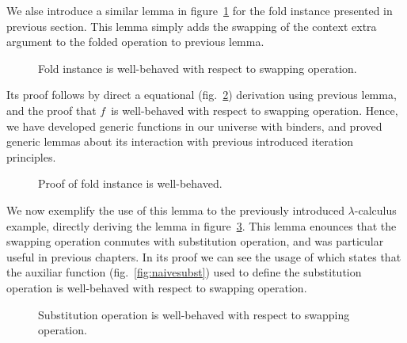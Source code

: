\documentclass{book}
\begin{document}
We alse introduce a similar lemma in figure~\ref{fig:swapfoldCtx} for the fold instance presented in previous section. This lemma simply adds the swapping of the context extra argument to the folded operation to previous lemma. 

\begin{figure}[h]
  \caption{Fold instance is well-behaved with respect to swapping operation.}
\label{fig:swapfoldCtx}
\end{figure}

Its proof follows by direct a equational (fig.~\ref{fig:swapfoldCtxproof}) derivation using previous lemma, and the proof that $f$\ is well-behaved with respect to swapping operation. Hence, we have developed generic functions in our universe with binders, and proved generic lemmas about its interaction with previous introduced iteration principles. 

\begin{figure}[h]
  \caption{Proof of fold instance is well-behaved.}
\label{fig:swapfoldCtxproof}
\end{figure}


We now exemplify the use of this lemma to the previously introduced $\lambda$-calculus example, directly deriving the lemma in figure~\ref{fig:swapsubst}. This lemma enounces that the swapping operation conmutes with substitution operation, and was particular useful in previous chapters. In its proof we can see the usage of  which states that the auxiliar function  (fig.~\ref{fig:naivesubst}) used to define the substitution operation is well-behaved with respect to swapping operation. 

\begin{figure}[h!]
  \caption{Substitution operation is well-behaved with respect to swapping operation.}
\label{fig:swapsubst}
\end{figure}


  



  

\end{document}
